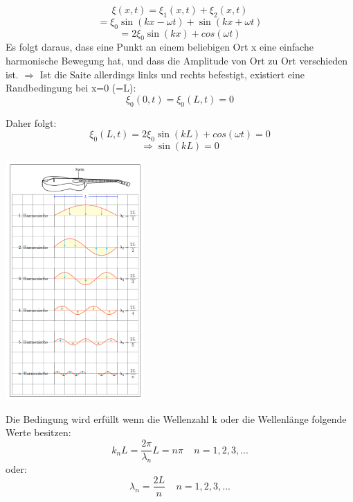 \documentclass[7pt]{article}
\begin{document}
\begin{multicols*}{3}
\begin{equation*}
\xi(x,t) = \xi _1(x,t) + \xi _2(x,t)
\end{equation*}
\begin{equation*}
= \xi _0 \sin(kx-\omega t) + \sin(kx+\omega t)
\end{equation*}
\begin{equation*}
= 2 \xi _0 \sin(kx) + cos(\omega t)
\end{equation*}
\newline
Es folgt daraus, dass eine Punkt an einem beliebigen Ort x eine einfache harmonische Bewegung hat, und dass die Amplitude von Ort zu Ort verschieden ist.\newline
$\Longrightarrow$ Ist die Saite allerdings links und rechts befestigt, existiert eine Randbedingung bei x=0 (=L):
\begin{equation*}
\xi _0 (0,t) = \xi _0 (L,t) = 0
\end{equation*}

Daher folgt:
\begin{equation*}
\xi _0 (L,t) = 2 \xi _0 \sin(kL) + cos(\omega t) = 0
\end{equation*}
\begin{equation*}
	\Longrightarrow \sin(kL) = 0
\end{equation*}

\begin{center}
	\includegraphics[width=150pt]{images/harmonische_saite.png}
\end{center}

\columnbreak

Die Bedingung wird erf{\"u}llt wenn die Wellenzahl k oder die Wellenl{\"a}nge folgende Werte besitzen:
\newline
\begin{equation*}
k_n L = \frac{2\pi}{\lambda _n}L = n\pi  \>\>\>\>\> n=1,2,3,...
\end{equation*}
oder:
\begin{equation*}
\lambda _n = \frac{2L}{n}  \>\>\>\>\> n=1,2,3,...
\end{equation*}



\end{multicols*}
\end{document}
